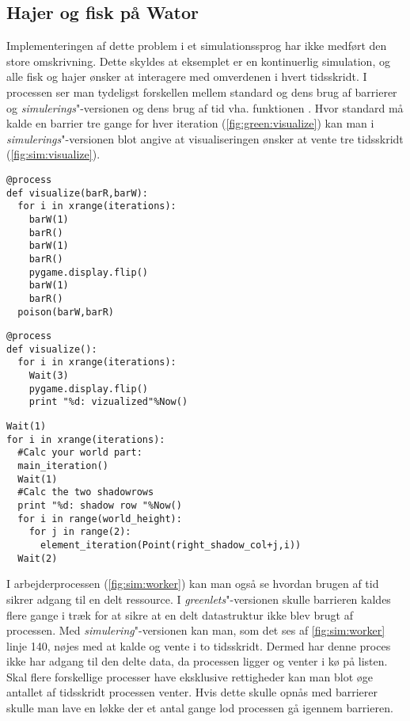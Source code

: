\subsection{Hajer og fisk på Wator}
Implementeringen af dette problem  i et simulationssprog har ikke medført den store omskrivning. Dette skyldes at eksemplet er en kontinuerlig simulation, og alle fisk og hajer ønsker at interagere med omverdenen i hvert tidsskridt. I processen  ser man tydeligst forskellen mellem standard \pycsp og dens brug af barrierer og \emph{simulerings}"-versionen og dens brug af tid vha. funktionen . Hvor standard \pycsp må kalde en barrier tre gange for hver iteration (\cref{fig:green:visualize}) kan man i \emph{simulerings}"-versionen blot angive at visualiseringen ønsker at vente tre tidsskridt (\cref{fig:sim:visualize}). 

\begin{lstlisting}[firstnumber=157 ,float=hbtp, label=fig:green:visualize, caption=\code{Greenlets}"-versionen af visualize]
@process
def visualize(barR,barW):
  for i in xrange(iterations):
    barW(1)
    barR()
    barW(1)
    barR()
    pygame.display.flip()
    barW(1)
    barR()
  poison(barW,barR)     
\end{lstlisting}

\begin{lstlisting}[firstnumber=144 ,float=hbtp, label=fig:sim:visualize, caption=\code{simulerings}"-versionen af visualize]
@process
def visualize():
  for i in xrange(iterations):
    Wait(3)  
    pygame.display.flip()
    print "%d: vizualized"%Now()
\end{lstlisting}

\begin{lstlisting}[firstnumber=130 ,float=hbtp, label=fig:sim:worker, caption=Uddrag af arbejderprocessen i simulering]
Wait(1)
for i in xrange(iterations):
  #Calc your world part:
  main_iteration()
  Wait(1)
  #Calc the two shadowrows
  print "%d: shadow row "%Now()
  for i in range(world_height):
    for j in range(2):
      element_iteration(Point(right_shadow_col+j,i))
  Wait(2)
\end{lstlisting}

I arbejderprocessen (\cref{fig:sim:worker}) kan man også se hvordan brugen af tid  sikrer adgang til en delt ressource. I  \emph{greenlets}"-versionen skulle barrieren  kaldes flere gange i træk for at sikre at en delt datastruktur ikke blev brugt af processen. Med \emph{simulering}"-versionen kan man, som det ses af \cref{fig:sim:worker} linje 140, nøjes med at kalde  og vente i to tidsskridt. Dermed har denne proces ikke har adgang til den delte data, da processen  ligger og venter i kø på  listen. Skal flere forskellige processer have eksklusive rettigheder kan man blot øge antallet af tidsskridt processen venter. Hvis dette skulle opnås med barrierer skulle man lave en løkke der et antal gange lod processen gå igennem barrieren.

